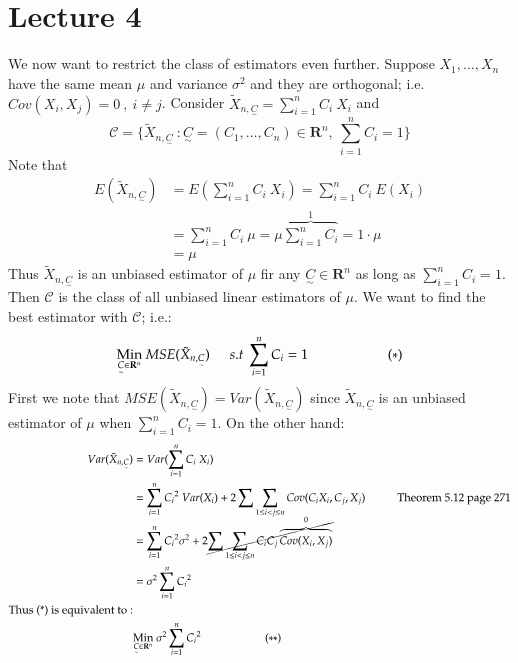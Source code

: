 \documentclass[14pt,twoside,a4paper,fleqn]{article}
\theoremstyle{plain}
\begin{document}
\newpage
\section{Lecture 4}
We now want to restrict the class of estimators even further. Suppose $X_1,\ldots,X_n$ have the same mean $\mu$ and variance $\sigma^2$ and they are orthogonal; i.e. \mbox{$Cov(X_i,X_j) = 0\ ,\ i\neq j$}. Consider $\tilde{X}_{n,\underset{\sim}{C}} = \sum_{i=1}^n C_i\ X_i$ and
$$\mathscr{C} = \Big\{\tilde{X}_{n,\underset{\sim}{C}}\ \colon \underset{\sim}{C} = 
	(C_1,\ldots,C_n)\in \mathbf{R}^n ,\ \sum_{i=1}^n C_i = 1 \Big\} $$
Note that
\begin{equation*}
\begin{split}
E(\tilde{X}_{n,\underset{\sim}{C}}) &= E(\sum_{i=1}^n C_i\ X_i) = \sum_{i=1}^n C_i\ E(X_i)\\
	&= \sum_{i=1}^n C_i\ \mu = \mu\overbrace{\sum_{i=1}^n C_i}^1 = 1\cdot\mu\\
	&=\mu
\end{split}
\end{equation*}
Thus $\tilde{X}_{n,\underset{\sim}{C}}$ is an unbiased estimator of $\mu$ fir any $\underset{\sim}{C}\in\mathbf{R}^n$ as long as $\sum_{i=1}^n C_i = 1$.
Then $\mathscr{C}$ is the class of all unbiased linear estimators of $\mu$. We want to find the best estimator with $\mathscr{C}$; i.e.:
$$\underset{\underset{\sim}{C}\in\mathbf{R}^n}{\text{Min}}\ MSE(\tilde{X}_{n,\underset{\sim}{C}})\tab[0.5cm] s.t\ \sum_{i=1}^n C_i = 1\tab[2cm] (*)$$
First we note that $MSE(\tilde{X}_{n,\underset{\sim}{C}}) = Var(\tilde{X}_{n,\underset{\sim}{C}})$ since $\tilde{X}_{n,\underset{\sim}{C}}$ is an unbiased estimator of $\mu$ when $\sum_{i=1}^n C_i = 1$. On the other hand:
\begin{equation*}
\begin{split}
Var(\tilde{X}_{n,\underset{\sim}{C}}) &= Var(\sum_{i=1}^n C_i\ X_i)\\
	&= \sum_{i=1}^n {C_i}^2\ Var(X_i) + 2\sum\sum_{1\leq i<j\leq n} Cov(C_iX_i,C_j,X_j)\tab \text{Theorem 5.12 page 271}\\
	&= \sum_{i=1}^n {C_i}^2 \sigma^2 + 2 \cancel{\sum\sum_{1\leq i<j\leq n} C_iC_j\overbrace{Cov(X_i,X_j)}^0}\\
	&= \sigma^2\sum_{i=1}^n {C_i}^2 \\
\text{Thus (*) is equivalent to}:\\
	&\underset{\underset{\sim}{C}\in\mathbf{R}^n}{\text{Min}}\ \sigma^2\sum_{i=1}^n {C_i}^2\tab[2cm] (**)
\end{split}
\end{equation*}
\end{document}
